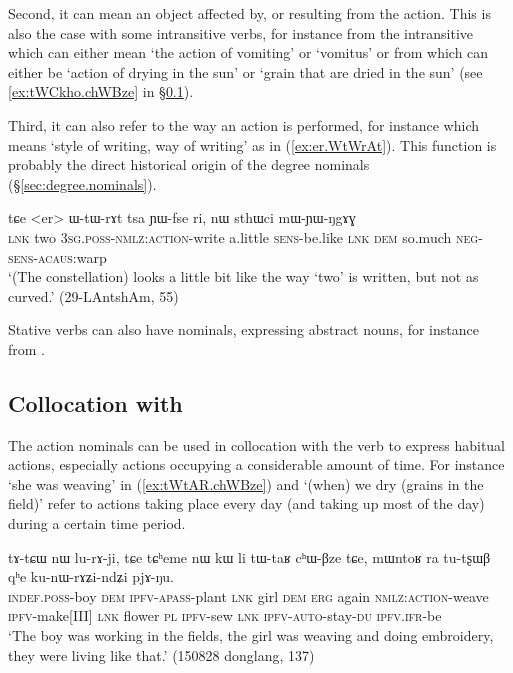 Second, it can mean an object affected by, or resulting from the action. This is also the case with some intransitive verbs, for instance  from the intransitive  which can either mean `the action of vomiting' or `vomitus' or  from  which can either be `action of drying in the sun' or `grain that are dried in the sun' (see \ref{ex:tWCkho.chWBze} in §\ref{sec:action.nominal.Bzu}).

Third, it can also refer to the way an action is performed, for instance  which means `style of writing, way of writing' as in (\ref{ex:er.WtWrAt}). This function is probably the direct historical origin of the degree nominals (§\ref{sec:degree.nominals}).

\begin{exe}
\ex \label{ex:er.WtWrAt}
\gll  tɕe <er> ɯ-tɯ-rɤt tsa ɲɯ-fse ri, nɯ sthɯci mɯ-ɲɯ-ŋgɤɣ \\
\textsc{lnk} two \textsc{3sg}.\textsc{poss}-\textsc{nmlz}:\textsc{action}-write a.little \textsc{sens}-be.like \textsc{lnk} \textsc{dem} so.much \textsc{neg}-\textsc{sens}-\textsc{acaus}:warp \\
\glt `(The constellation) looks a little bit like the way `two' is written, but not as curved.' (29-LAntshAm, 55)
\end{exe} 
 
Stative verbs can also have  nominals, expressing abstract nouns, for instance  from .

 \subsection{Collocation with } \label{sec:action.nominal.Bzu}
The  action nominals can be used in collocation with the verb  to express habitual actions, especially actions occupying a considerable amount of time. For instance  `she was weaving' in (\ref{ex:tWtAR.chWBze}) and  `(when) we dry (grains in the field)' refer to actions taking place every day (and taking up most of the day) during a certain time period.

\begin{exe}
\ex \label{ex:tWtAR.chWBze}
\gll tɤ-tɕɯ nɯ lu-rɤ-ji,  tɕe tɕʰeme nɯ kɯ li tɯ-taʁ cʰɯ-βze tɕe, mɯntoʁ ra tu-tʂɯβ qʰe ku-nɯ-rɤʑi-ndʑi pjɤ-ŋu.  \\
\textsc{indef}.\textsc{poss}-boy \textsc{dem} \textsc{ipfv}-\textsc{apass}-plant \textsc{lnk} girl \textsc{dem} \textsc{erg} again \textsc{nmlz}:\textsc{action}-weave \textsc{ipfv}-make[III] \textsc{lnk} flower \textsc{pl} \textsc{ipfv}-sew \textsc{lnk} \textsc{ipfv}-\textsc{auto}-stay-\textsc{du} \textsc{ipfv}.\textsc{ifr}-be \\
\glt `The boy was working in the fields, the girl was weaving and doing embroidery, they were living like that.' (150828 donglang, 137)
\end{exe}

